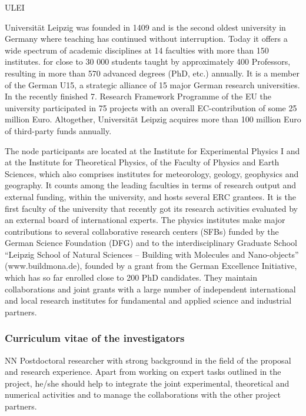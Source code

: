 \begin{sitedescription}{ULEI} \label{desc:ULEI}

 Universität Leipzig was founded in 1409 and is the second oldest university in Germany where teaching has continued 
 without interruption. 
  Today it offers a wide spectrum of academic disciplines at 14 faculties with more than 150 institutes. 
  for close to 30 000 students taught by approximately 400 Professors, 
  resulting in more than 570 advanced degrees (PhD, etc.) annually.
  It is a member of the German U15, a strategic alliance of 15 major German research universities. 
  In the recently finished 7. Research Framework Programme of the EU the university participated 
  in 75 projects with an overall EC-contribution of some 25 million Euro. 
  Altogether, Universität Leipzig acquires more than 100 million Euro of third-party funds annually.

  The node participants are located at the Institute for Experimental Physics I and at the Institute for Theoretical Physics, 
  of the Faculty of Physics and Earth Sciences, which also comprises institutes for meteorology, geology, geophysics 
  and geography. 
  It counts among the leading faculties in terms of research output and external funding, within the university, 
  and hosts several ERC grantees. 
  It is the first faculty of the university that recently got its research activities evaluated by an external board of
  international experts. 
  The physics institutes make major contributions to several collaborative research centers (SFBs) funded by the 
  German Science Foundation (DFG) and to the interdisciplinary Graduate School ``Leipzig School of Natural Sciences -- 
  Building with Molecules and Nano-objects'' (www.buildmona.de), founded by a grant from the German Excellence Initiative,
  which has so far enrolled close to 200 PhD candidates. 
  They maintain collaborations and joint grants with a large number of independent international 
  and local research institutes for fundamental and applied science and industrial partners. 

\subsubsection*{Curriculum vitae of the investigators}




\begin{participant}[type=res,PM=48,salary=5500]{NN}
Postdoctoral researcher with strong background in the field of the proposal and research experience. 
Apart from working on expert tasks outlined in the project, he/she should help to integrate the joint experimental, 
theoretical and numerical activities and to manage the collaborations with the other project partners.
\end{participant}


\end{sitedescription}
